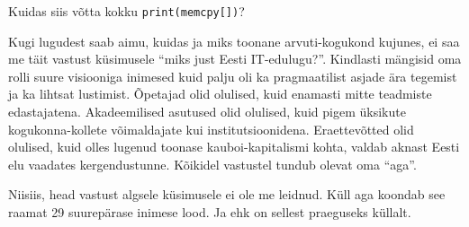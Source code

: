 Kuidas siis võtta kokku \verb|print(memcpy[])|? 

Kugi lugudest saab aimu, kuidas ja miks toonane arvuti-kogukond kujunes, ei saa 
me täit vastust küsimusele \enquote{miks just Eesti IT-edulugu?}. Kindlasti 
mängisid oma rolli suure visiooniga inimesed kuid palju oli ka pragmaatilist 
asjade ära tegemist ja ka lihtsat lustimist. Õpetajad olid olulised, kuid 
enamasti mitte teadmiste edastajatena. Akadeemilised asutused olid olulised, 
kuid pigem üksikute kogukonna-kollete võimaldajate kui institutsioonidena. 
Eraettevõtted olid olulised, kuid olles lugenud toonase kauboi-kapitalismi 
kohta, valdab aknast Eesti elu vaadates kergendustunne. Kõikidel vastustel 
tundub olevat oma \enquote{aga}.

Niisiis, head vastust algsele küsimusele ei ole me leidnud. Küll aga koondab 
see raamat 29 suurepärase inimese lood. Ja ehk on sellest praeguseks küllalt.
